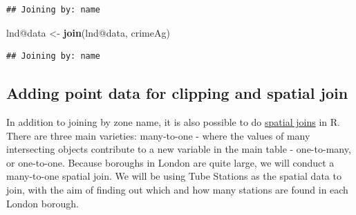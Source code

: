 \documentclass[]{article}
\newenvironment{Shaded}{}{}
\newcommand{\KeywordTok}[1]{\textcolor[rgb]{0.00,0.44,0.13}{\textbf{{#1}}}}
\newcommand{\DataTypeTok}[1]{\textcolor[rgb]{0.56,0.13,0.00}{{#1}}}
\newcommand{\StringTok}[1]{\textcolor[rgb]{0.25,0.44,0.63}{{#1}}}
\newcommand{\CommentTok}[1]{\textcolor[rgb]{0.38,0.63,0.69}{\textit{{#1}}}}
\newcommand{\NormalTok}[1]{{#1}}
\begin{document}
\begin{Shaded}
\end{Shaded}
\begin{verbatim}
## Joining by: name
\end{verbatim}
\begin{Shaded}
\begin{Highlighting}[]
\NormalTok{lnd@data <- }\KeywordTok{join}\NormalTok{(lnd@data, crimeAg)}
\end{Highlighting}
\end{Shaded}
\begin{verbatim}
## Joining by: name
\end{verbatim}
\subsection{Adding point data for clipping and spatial join}

In addition to joining by zone name, it is also possible to do
\href{http://help.arcgis.com/en/arcgisdesktop/10.0/help/index.html\#//00080000000q000000}{spatial
joins} in R. There are three main varieties: many-to-one - where the
values of many intersecting objects contribute to a new variable in the
main table - one-to-many, or one-to-one. Because boroughs in London are
quite large, we will conduct a many-to-one spatial join. We will be
using Tube Stations as the spatial data to join, with the aim of finding
out which and how many stations are found in each London borough.
\end{document}
